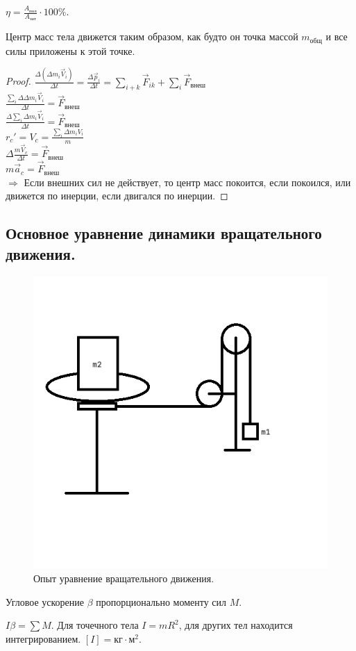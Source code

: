 \documentclass{article}
\begin{document}
	\begin{definition}[КПД]
		$\eta = \frac{A_{\text{пол}}}{A_{\text{зат}}} \cdot 100\%$.
	\end{definition}
	\begin{theorem}
		Центр масс тела движется таким образом, как будто он точка массой $m_{\text{общ}}$ и все силы приложены к этой точке.
	\end{theorem}
	\begin{proof}
		$\frac{\varDelta (\varDelta m_i \vec{V}_i)}{\varDelta t} = \frac{\varDelta \vec{p}_i}{\varDelta t} = \sum\limits_{i + k} \vec{F}_{ik} + \sum\limits_i \vec{F}_{\text{внеш}}$ \\
		$\frac{\sum\limits_i \varDelta \varDelta m_i \vec{V}_i}{\varDelta t} = \vec{F}_{\text{внеш}}$ \\
		$\frac{\varDelta \sum\limits_i \varDelta m_i \vec{V}_i}{\varDelta t} = \vec{F}_{\text{внеш}}$ \\
		$r_c' = V_c = \frac{\sum\limits_i \varDelta m_i V_i}{m}$ \\
		$\varDelta \frac{m \vec{V}_c}{\varDelta t} = \vec{F}_{\text{внеш}}$ \\
		$m \vec{a}_c = \vec{F}_{\text{внеш}}$ \\
		$\Rightarrow$ Если внешних сил не действует, то центр масс покоится, если покоился, или движется по инерции, если двигался по инерции.
	\end{proof}
	\subsection{Основное уравнение динамики вращательного движения.}
	\begin{figure}[H]
		\includegraphics[height=0.5\textwidth]{extra-materials/УравнениеВращательногоДвиженияОпыт}
		\caption{Опыт уравнение вращательного движения.}
	\end{figure}
	Угловое ускорение $\beta$ пропорционально моменту сил $M$.
	\begin{definition}
		$I \beta = \sum M$. Для точечного тела $I = mR^2$, для других тел находится интегрированием. $[I] = \text{кг} \cdot \text{м}^2$.
	\end{definition}
\end{document}

